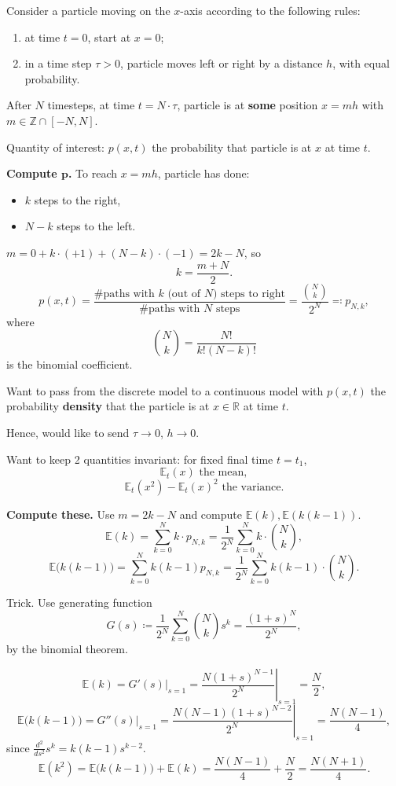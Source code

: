 \documentclass[12pt]{article}
\theoremstyle{definition}
\begin{document}
Consider a particle moving on the $x$-axis according to the following rules:
\begin{enumerate}[label=(\arabic*)]
\item at time $t=0$, start at $x=0$;
\item\label{distance_step} in a time step $\tau>0$, particle moves left or right by a distance $h$, with equal probability.
\end{enumerate}

After $N$ timesteps, at time $t=N\cdot\tau$, particle is at \textbf{some} position $x=mh$ with $m\in\mathbb{Z}\cap[-N,N]$.

Quantity of interest: $p(x,t)$ the probability that particle is at $x$ at time $t$.

\textbf{Compute $\boldsymbol{p}$.} To reach $x=mh$, particle has done:
\begin{itemize}
\item $k$ steps to the right,
\item $N-k$ steps to the left.
\end{itemize}
$m=0+k\cdot(+1)+(N-k)\cdot(-1)=2k-N$, so
\[k=\frac{m+N}{2}.\]
\[p(x,t)=\frac{\text{\# paths with }k\text{ (out of }N\text{) steps to right}}{\text{\# paths with }N\text{ steps}}=\frac{\binom{N}{k}}{2^N}\eqqcolon p_{N,k},\]
where
\[\binom{N}{k}=\frac{N!}{k!(N-k)!}\]
is the binomial coefficient.

Want to pass from the discrete model to a continuous model with $p(x,t)$ the probability \textbf{density} that the particle is at $x\in\mathbb{R}$ at time $t$.

Hence, would like to send $\tau\to0$, $h\to0$.

Want to keep 2 quantities invariant: for fixed final time $t=t_1$,
\[\mathbb{E}_t(x)\text{ the mean},\]
\[\mathbb{E}_t(x^2)-\mathbb{E}_t(x)^2\text{ the variance}.\]

\textbf{Compute these.} Use $m=2k-N$ and compute $\mathbb{E}(k),\mathbb{E}(k(k-1))$.
\[\mathbb{E}(k)=\sum_{k=0}^Nk\cdot p_{N,k}=\frac{1}{2^N}\sum_{k=0}^Nk\cdot\binom{N}{k},\]
\[\mathbb{E}\big(k(k-1)\big)=\sum_{k=0}^Nk(k-1)p_{N,k}=\frac{1}{2^N}\sum_{k=0}^Nk(k-1)\cdot\binom{N}{k}.\]

Trick. Use generating function
\[G(s)\coloneqq\frac{1}{2^N}\sum_{k=0}^N\binom{N}{k}s^k=\frac{(1+s)^N}{2^N},\]
by the binomial theorem.

\[\mathbb{E}(k)=G'(s)|_{s=1}=\left.\frac{N(1+s)^{N-1}}{2^N}\right|_{s=1}=\frac{N}{2},\]
\[\mathbb{E}\big(k(k-1)\big)=G''(s)|_{s=1}=\left.\frac{N(N-1)(1+s)^{N-2}}{2^N}\right|_{s=1}=\frac{N(N-1)}{4},\]
since $\frac{d^2}{ds^2}s^k=k(k-1)s^{k-2}$.
\[\mathbb{E}(k^2)=\mathbb{E}\big(k(k-1)\big)+\mathbb{E}(k)=\frac{N(N-1)}{4}+\frac{N}{2}=\frac{N(N+1)}{4}.\]
\end{document}
